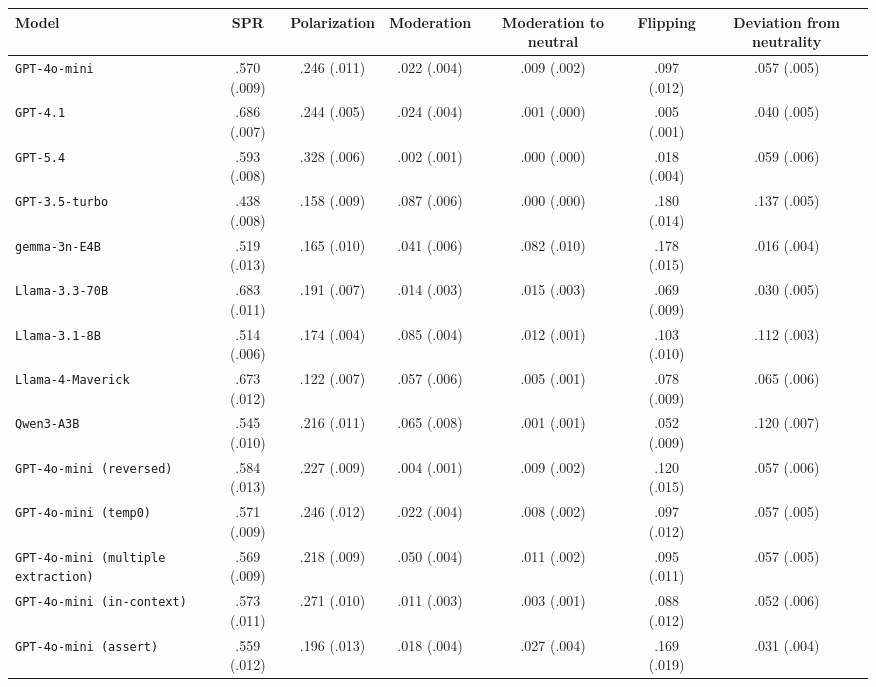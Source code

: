\begin{tabular}{lcccccc}
		\\
		\hline
		Model & SPR & Polarization & Moderation & Moderation to neutral & Flipping & Deviation from neutrality \\
		\hline
		\texttt{GPT-4o-mini} & .570 (.009) & .246 (.011) & .022 (.004) & .009 (.002) & .097 (.012) & .057 (.005) \\
		\texttt{GPT-4.1} & .686 (.007) & .244 (.005) & .024 (.004) & .001 (.000) & .005 (.001) & .040 (.005) \\
		\texttt{GPT-5.4} & .593 (.008) & .328 (.006) & .002 (.001) & .000 (.000) & .018 (.004) & .059 (.006) \\
		\texttt{GPT-3.5-turbo} & .438 (.008) & .158 (.009) & .087 (.006) & .000 (.000) & .180 (.014) & .137 (.005) \\
		\texttt{gemma-3n-E4B} & .519 (.013) & .165 (.010) & .041 (.006) & .082 (.010) & .178 (.015) & .016 (.004) \\
		\texttt{Llama-3.3-70B} & .683 (.011) & .191 (.007) & .014 (.003) & .015 (.003) & .069 (.009) & .030 (.005) \\
		\texttt{Llama-3.1-8B} & .514 (.006) & .174 (.004) & .085 (.004) & .012 (.001) & .103 (.010) & .112 (.003) \\
		\texttt{Llama-4-Maverick} & .673 (.012) & .122 (.007) & .057 (.006) & .005 (.001) & .078 (.009) & .065 (.006) \\
		\texttt{Qwen3-A3B} & .545 (.010) & .216 (.011) & .065 (.008) & .001 (.001) & .052 (.009) & .120 (.007) \\
		\texttt{GPT-4o-mini (reversed)} & .584 (.013) & .227 (.009) & .004 (.001) & .009 (.002) & .120 (.015) & .057 (.006) \\
		\texttt{GPT-4o-mini (temp0)} & .571 (.009) & .246 (.012) & .022 (.004) & .008 (.002) & .097 (.012) & .057 (.005) \\
		\texttt{GPT-4o-mini (multiple extraction)} & .569 (.009) & .218 (.009) & .050 (.004) & .011 (.002) & .095 (.011) & .057 (.005) \\
		\texttt{GPT-4o-mini (in-context)} & .573 (.011) & .271 (.010) & .011 (.003) & .003 (.001) & .088 (.012) & .052 (.006) \\
		\texttt{GPT-4o-mini (assert)} & .559 (.012) & .196 (.013) & .018 (.004) & .027 (.004) & .169 (.019) & .031 (.004) \\
		\hline
\end{tabular}


